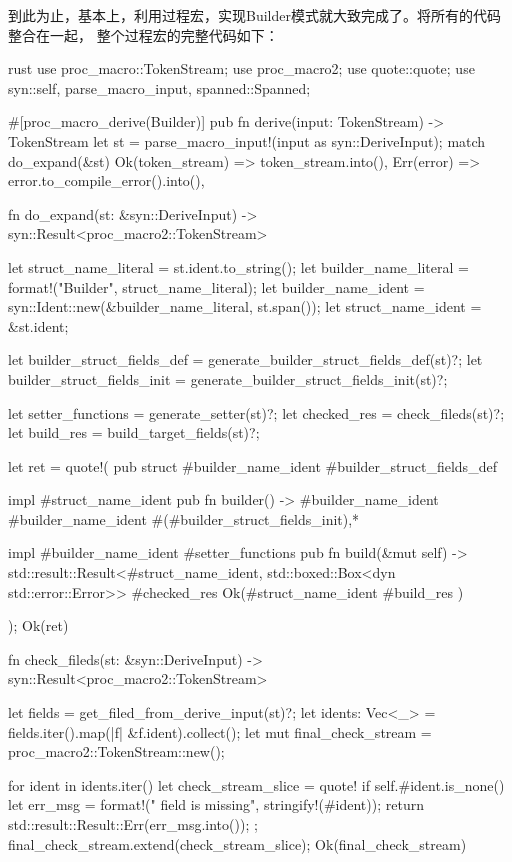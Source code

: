 到此为止，基本上，利用过程宏，实现Builder模式就大致完成了。将所有的代码整合在一起，
整个过程宏的完整代码如下：
\begin{code-block}{rust}
use proc_macro::TokenStream;
use proc_macro2;
use quote::quote;
use syn::{self, parse_macro_input, spanned::Spanned};

#[proc_macro_derive(Builder)]
pub fn derive(input: TokenStream) -> TokenStream {
    let st = parse_macro_input!(input as syn::DeriveInput);
    match do_expand(&st) {
        Ok(token_stream) => token_stream.into(),
        Err(error) => error.to_compile_error().into(),
    }
}

fn do_expand(st: &syn::DeriveInput) -> syn::Result<proc_macro2::TokenStream> {
    let struct_name_literal = st.ident.to_string();
    let builder_name_literal = format!("{}Builder", struct_name_literal);
    let builder_name_ident = syn::Ident::new(&builder_name_literal, st.span());
    let struct_name_ident = &st.ident;

    let builder_struct_fields_def = generate_builder_struct_fields_def(st)?;
    let builder_struct_fields_init = generate_builder_struct_fields_init(st)?;

    let setter_functions = generate_setter(st)?;
    let checked_res = check_fileds(st)?;
    let build_res = build_target_fields(st)?;

    let ret = quote!(
        pub struct #builder_name_ident {
            #builder_struct_fields_def
        }

        impl #struct_name_ident {
            pub fn builder() -> #builder_name_ident {
                #builder_name_ident {
                    #(#builder_struct_fields_init),*
                }
            }
        }

        impl #builder_name_ident {
            #setter_functions
            pub fn build(&mut self) -> std::result::Result<#struct_name_ident, std::boxed::Box<dyn std::error::Error>>{
                #checked_res
                Ok(#struct_name_ident {
                    #build_res
                })
            }
        }

    );
    Ok(ret)
}

fn check_fileds(st: &syn::DeriveInput) -> syn::Result<proc_macro2::TokenStream> {
    let fields = get_filed_from_derive_input(st)?;
    let idents: Vec<_> = fields.iter().map(|f| &f.ident).collect();
    let mut final_check_stream = proc_macro2::TokenStream::new();

    for ident in idents.iter() {
        let check_stream_slice = quote! {
            if self.#ident.is_none() {
                let err_msg = format!("{} field is missing", stringify!(#ident));
                return std::result::Result::Err(err_msg.into());
            }
        };
        final_check_stream.extend(check_stream_slice);
    }
    Ok(final_check_stream)
}


\end{code-block}
